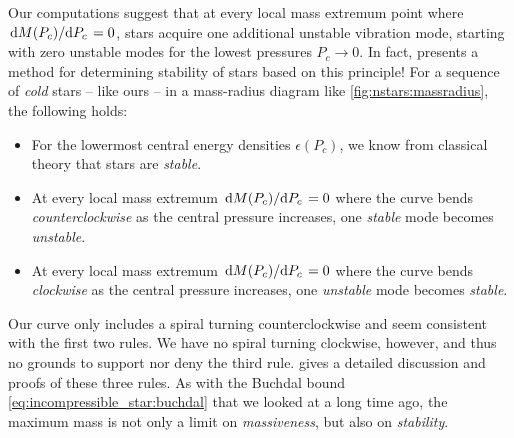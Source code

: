 Our computations suggest that at every local mass extremum point where $\odv{M(P_c)}/{P_c} = 0$, stars acquire one additional unstable vibration mode, starting with zero unstable modes for the lowest pressures $P_c \rightarrow 0$.
In fact, \cite{ref:stability_methods} presents a method for determining stability of stars based on this principle!
For a sequence of \emph{cold} stars -- like ours -- in a mass-radius diagram like \cref{fig:nstars:massradius}, the following holds:
\begin{itemize}
\item For the lowermost central energy densities $\epsilon(P_c)$, we know from classical theory that stars are \emph{stable}.
\item At every local mass extremum $\odv{M(P_c)}/{P_c} = 0$ where the curve bends \emph{counterclockwise} as the central pressure increases, one \emph{stable} mode becomes \emph{unstable}.
\item At every local mass extremum $\odv{M(P_c)}/{P_c} = 0$ where the curve bends \emph{clockwise} as the central pressure increases, one \emph{unstable} mode becomes \emph{stable}.
\end{itemize}
Our curve only includes a spiral turning counterclockwise and seem consistent with the first two rules.
We have no spiral turning clockwise, however, and thus no grounds to support nor deny the third rule. 
\cite{ref:stability_rules_thorne} gives a detailed discussion and proofs of these three rules.
As with the Buchdal bound \eqref{eq:incompressible_star:buchdal} that we looked at a long time ago, the maximum mass is not only a limit on \emph{massiveness}, but also on \emph{stability}.


